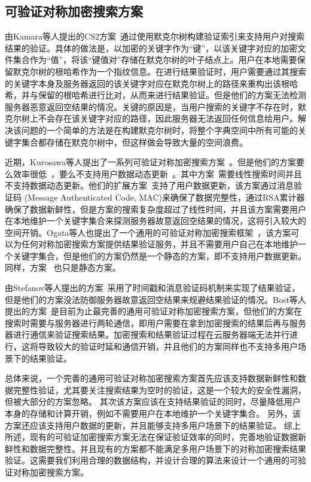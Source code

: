 \subsection{可验证对称加密搜索方案}
由Kamara等人提出的CS2方案~\cite{kamara2011cs2}通过使用默克尔树构建验证索引来支持用户对搜索结果的验证。具体的做法是，以加密的关键字作为“键”，以该关键字对应的加密文件集合作为“值”，将该“键值对”存储在默克尔树的叶子结点上。用户在本地需要保留默克尔树的根哈希作为一个指纹信息。在进行结果验证时，用户需要通过其搜索的关键字本身及服务器返回的该关键字对应在默克尔树上的路径来重构出该根哈希，并与保留的根哈希进行比对，从而来进行结果验证。但是他们的方案无法检测服务器恶意返回空结果的情况。关键的原因是，当用户搜索的关键字不存在时，默克尔树上不会存在该关键字对应的路径，因此服务器无法返回任何信息给用户。解决该问题的一个简单的方法是在构建默克尔树时，将整个字典空间中所有可能的关键字集合都存储在默克尔树中，但这样做会导致大量的空间浪费。

近期，Kurosawa等人提出了一系列可验证对称加密搜索方案~\cite{kurosawa2012uc,kurosawa2013update,ogataefficient}。但是他们的方案要么效率很低~\cite{kurosawa2012uc,kurosawa2013update}，要么不支持用户数据动态更新~\cite{kurosawa2012uc,ogataefficient}。其中方案~\cite{kurosawa2012uc}需要线性搜索时间并且不支持数据动态更新。他们的扩展方案~\cite{kurosawa2013update}支持了用户数据更新，该方案通过消息验证码 (Message Authenticated Code, MAC)来确保了数据完整性，通过RSA累计器确保了数据新鲜性，但是方案的搜索复杂度超过了线性时间，并且该方案需要用户在本地维护一个关键字集合来探测服务器故意返回空结果的情况，这将引入较大的空间开销。Ogata等人也提出了一个通用的可验证对称加密搜索框架~\cite{ogataefficient}，该方案可以为任何对称加密搜索方案提供结果验证服务，并且不需要用户自己在本地维护一个关键字集合，但是他们的方案仍然是一个静态的方案，即不支持用户数据更新。同样，方案~\cite{chai2012verifiable} \cite{cheng2015verifiable}也只是静态方案。

由Stefanov等人提出的方案~\cite{stefanov2014practical}采用了时间戳和消息验证码机制来实现了结果验证，但是他们的方案没法防御服务器故意返回空结果来规避结果验证的情况。Bost等人提出的方案~\cite{bost2016verifiable}是目前为止最完善的通用可验证对称加密搜索方案，但他们的方案在搜索时需要与服务器进行两轮通信，即用户需要在拿到加密搜索的结果后再与服务器进行通信来验证搜索结果。加密搜索和结果验证过程在云服务器端无法并行进行，这将导致较大的验证时延和通信开销，并且他们的方案同样也不支持多用户场景下的结果验证。

总体来说，一个完善的通用可验证对称加密搜索方案首先应该支持数据新鲜性和数据完整性验证，尤其要关注搜索结果为空时的验证，这是一个较大的安全性漏洞，但被大部分的方案忽略。
其次该方案应该在支持结果验证的同时，尽量降低用户本身的存储和计算开销，例如不需要用户在本地维护一个关键字集合。
另外，该方案还应该支持用户数据的更新，并且能够支持多用户场景下的结果验证。
综上所述，现有的可验证加密搜索方案无法在保证验证效率的同时，完善地验证数据新鲜性和数据完整性。并且现有的方案都不能满足多用户场景下的对称加密搜索结果验证。这需要我们利用合理的数据结构，并设计合理的算法来设计一个通用的可验证对称加密搜索方案。

